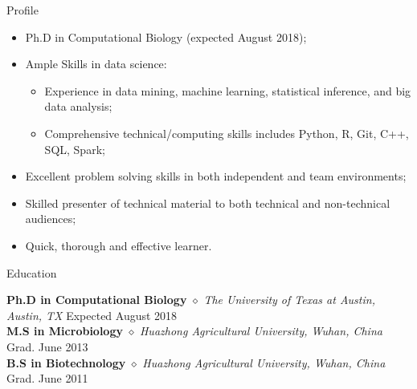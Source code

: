 \documentclass{my_resume} %
\begin{document}

\begin{rSection}{Profile}
\renewcommand\labelitemi{$\cdot$}
\begin{itemize}
  \item Ph.D in Computational Biology (expected August 2018);
  \vspace{-1.7em}\\
  \item Ample Skills in data science:
  \vspace{-1.7em}\\
    \begin{itemize}
      \item Experience in data mining, machine learning, statistical inference,
        and big data analysis;
      \vspace{-1.7em}\\
      \item Comprehensive technical/computing skills includes Python, R, Git,
        C++, SQL, Spark;
      \vspace{-1.7em}\\
    \end{itemize}
  \item Excellent problem solving skills in both independent and team
    environments;
  \vspace{-1.7em}\\
  \item Skilled presenter of technical material to both technical and
    non-technical audiences;
  \vspace{-1.7em}\\
  \item Quick, thorough and effective learner.
\end{itemize}
\end{rSection}


\begin{rSection}{Education}

{\bf Ph.D in Computational Biology} {$\diamond$} {\em The University of
Texas at Austin, Austin, TX} \hfill {Expected August 2018} \\
{\bf M.S in Microbiology} {$\diamond$} {\em Huazhong Agricultural University,
Wuhan, China} \hfill {Grad. June 2013} \\
{\bf B.S in Biotechnology} {$\diamond$} {\em Huazhong Agricultural University,
Wuhan, China} \hfill {Grad. June 2011}
\end{rSection}
\end{document}
